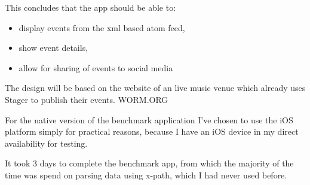 This concludes that the app should be able to:
\begin{itemize}
	\item display events from the xml based atom feed,
	\item show event details,
	\item allow for sharing of events to social media
\end{itemize}
The design will be based on the website of an live music venue which already uses Stager to publish their events. WORM.ORG

For the native version of the benchmark application I've chosen to use the iOS platform simply for practical reasons, because I have an iOS device in my direct availability for testing.

It took 3 days to complete the benchmark app, from which the majority of the time was spend on parsing data using x-path, which I had never used before.
